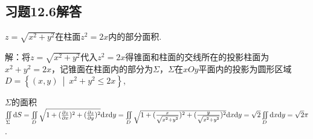 \documentclass[12pt,UTF8]{ctexart}
\newcommand\Set[2]{\left\{#1\ \middle\vert\ #2 \right\}}
\newcommand{\varIInt}[4]{\iint\limits_{#1}#2\mathrm d#3\mathrm d#4}
\newcommand{\SIInt}[3]{\iint\limits_{#1}#2\mathrm d#3}
\begin{document}
\subsection{习题12.6解答}
\begin{enumerate}
$z=\sqrt{x^2+y^2}$在柱面$z^2=2x$内的部分面积.

解：将$z=\sqrt{x^2+y^2}$代入$z^2=2x$得锥面和柱面的交线所在的投影柱面为$x^2+y^2=2x$，记锥面在柱面内的部分为$\Sigma$，$\Sigma$在$xOy$平面内的投影为圆形区域$D=\Set{(x,y)}{x^2+y^2\leqslant2x}$,

$\Sigma$的面积$\SIInt\Sigma{}S=\varIInt{D}{\sqrt{1+(\frac{\partial z}{\partial x})^2+(\frac{\partial z}{\partial y})^2}}xy=\varIInt{D}{\sqrt{1+(\frac x{\sqrt{x^2+y^2}})^2+(\frac y{\sqrt{x^2+y^2}})^2}}xy\\
=\sqrt2\varIInt{D}{}xy=\sqrt2\pi$.


\end{enumerate}
\end{document}
